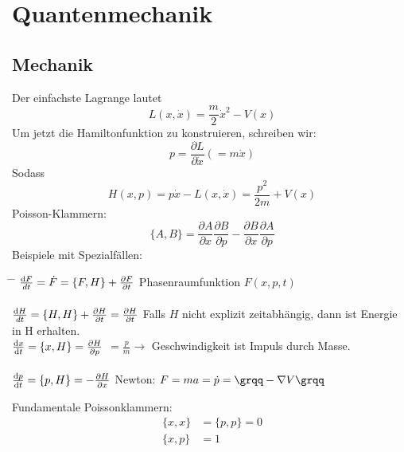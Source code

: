 	
\section{Quantenmechanik}
	\subsection{Mechanik}
		Der einfachste Lagrange lautet 
			\begin{equation*}
				L (x,\dot{x}) = \frac{m}{2} \dot{x}^2 - V(x) 
			\end{equation*}
		Um jetzt die Hamiltonfunktion zu konstruieren, schreiben wir:
			\begin{equation*}
				p=
				\frac{\partial L}{\partial \dot{x}}
				(=m \dot{x})
			\end{equation*}
		Sodass
			\begin{equation*}
				H(x,p)= 
				p \dot{x} - L(x,\dot{x}) = 
				\frac{p^2}{2m} + V(x)
			\end{equation*}
		Poisson-Klammern:
			\begin{equation}
				\{A,B\}=
				\frac{\partial A}{\partial x} \frac{\partial B}{\partial p}
				- \frac{\partial B}{\partial x} \frac{\partial A}{\partial p}
			\end{equation}
		Beispiele mit Spezialfällen:
		\begin{tabbing}
			\hspace{0.4\linewidth} \= \hspace{0.6\linewidth} \= \hfill \kill
			$\frac{\mathrm{d} F}{dt} = \dot{F} = \{F,H\} + \frac{\partial F}{\partial t}$ \> 
			Phasenraumfunktion $F(x,p,t)$ \\ \\
			$\frac{\mathrm{d} H}{dt} = \{H,H\} + \frac{\partial H}{\partial t} = \frac{\partial H}{\partial t}$ \>
			Falls $H$ nicht explizit zeitabhängig, dann ist Energie \\
			\hfill \>  in H erhalten. \\  %
			$\frac{\mathrm{d} x}{\mathrm{d} t} = \{x,H\} = \frac{\partial H}{\partial p}$ \>
			$=\frac{p}{m} \rightarrow$ Geschwindigkeit ist Impuls durch Masse. \\ \\
			$\frac{\mathrm{d} p}{\mathrm{d} t} = \{p,H\} = -\frac{\partial H}{\partial x}$ \>
			Newton: $F= ma= \dot{p} = \text{\grqq} - \nabla V \text{\grqq} $	%
		\end{tabbing}
		Fundamentale Poissonklammern:
			\begin{equation}
				\begin{split}
					\{x,x\} &=\{p,p\}= 0 \\
					\{x,p\} &= 1
				\end{split}
			\end{equation}
